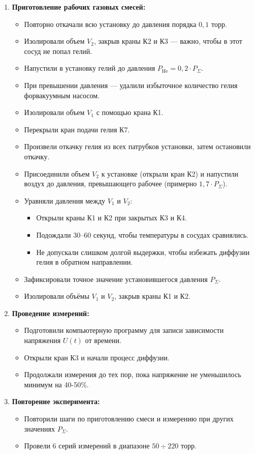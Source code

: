 \documentclass[a4paper,12pt]{article}
\begin{document}
\begin{enumerate}
    \item \textbf{Приготовление рабочих газовых смесей:}
    \begin{itemize}
        \item Повторно откачали всю установку до давления порядка $0{,}1$ торр.
        \item Изолировали объем $V_2$, закрыв краны К2 и К3 — важно, чтобы в этот сосуд не попал гелий.
        \item Напустили в установку гелий до давления $P_{\text{He}} = 0{,}2 \cdot P_\Sigma$.
        \item При превышении давления — удалили избыточное количество гелия форвакуумным насосом.
        \item Изолировали объем $V_1$ с помощью крана К1.
        \item Перекрыли кран подачи гелия К7.
        \item Произвели откачку гелия из всех патрубков установки, затем остановили откачку.
        \item Присоединили объем $V_2$ к установке (открыли кран К2) и напустили воздух до давления, превышающего рабочее (примерно $1{,}7 \cdot P_\Sigma$).
        \item Уравняли давления между $V_1$ и $V_2$:
        \begin{itemize}
            \item Открыли краны К1 и К2 при закрытых К3 и К4.
            \item Подождали 30–60 секунд, чтобы температуры в сосудах сравнялись.
            \item Не допускали слишком долгой выдержки, чтобы избежать диффузии гелия в обратном направлении.
        \end{itemize}
        \item Зафиксировали точное значение установившегося давления $P_\Sigma$.
        \item Изолировали объёмы $V_1$ и $V_2$, закрыв краны К1 и К2.
    \end{itemize}

    \item \textbf{Проведение измерений:}
    \begin{itemize}
        \item Подготовили компьютерную программу для записи зависимости напряжения $U(t)$ от времени.
        \item Открыли кран К3 и начали процесс диффузии.
        \item Продолжали измерения до тех пор, пока напряжение не уменьшилось минимум на 40-50\%.
    \end{itemize}

    \item \textbf{Повторение эксперимента:}
    \begin{itemize}
        \item Повторили шаги по приготовлению смеси и измерению при других значениях $P_\Sigma$.
        \item Провели 6 серий измерений в диапазоне $50 \div 220$ торр.
    \end{itemize}
    \end{enumerate}
\end{document}
